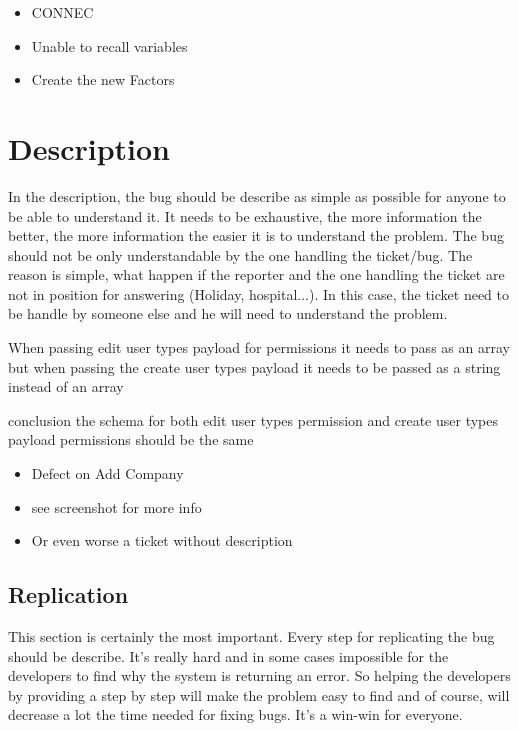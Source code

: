 \documentclass[a4paper,article,oneside]{memoir}
\begin{document}
\noindent{}

\begin{itemize}
  \item CONNEC
  \item Unable to recall variables
  \item Create the new Factors
\end{itemize}
	
		
        \chapter{Description}
        In the description, the bug should be describe as simple as possible for anyone to be able to understand it. It needs to be exhaustive, the more information the better, the more information the easier it is to understand the problem. The bug should not be only understandable by the one handling the ticket/bug. The reason is simple, what happen if the reporter and the one handling the ticket are not in position for answering (Holiday, hospital...). In this case, the ticket need to be handle by someone else and he will need to understand the problem.
        
\noindent{}

When passing edit user types payload for permissions it needs to pass as an array but
when passing the create user types payload it needs to be passed as a string instead of an array

conclusion the schema for both edit user types permission and create user types payload permissions should be the same

\noindent{}  

\begin{itemize}
  \item Defect on Add Company
  \item see screenshot for more info
  \item Or even worse a ticket without description
\end{itemize}
     
        \section{Replication}
        This section is certainly the most important. Every step for replicating the bug should be describe. It's really hard and in some cases impossible for the developers to find why the system is returning an error. So helping the developers by providing a step by step will make the problem easy to find and of course, will decrease a lot the time needed for fixing bugs. It's a win-win for everyone.
\end{document}
